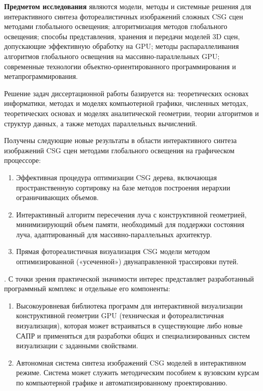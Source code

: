 \textbf{Предметом исследования} являются модели, методы и системные решения для  интерактивного синтеза фотореалистичных изображений сложных CSG сцен методами глобального освещения; алгоритмизация методов глобального освещения; способы представления, хранения и передачи моделей 3D сцен, допускающие эффективную  обработку на GPU; методы распараллеливания алгоритмов глобального освещения на массивно-параллельных GPU; современные технологии объектно-ориентированного программирования и метапрограммирования.

{\methods} Решение задач диссертационной работы базируется на: теоретических основах информатики, методах и моделях компьютерной графики, численных методах, теоретических основах и моделях аналитической геометрии, теории алгоритмов и структур данных, а также методах параллельных вычислений.

{\novelty} Получены следующие новые результаты в области интерактивного синтеза изображений CSG сцен методами глобального освещения на графическом процессоре:


\begin{enumerate}
  \item Эффективная процедура оптимизации CSG дерева, включающая пространственную сортировку на базе методов построения иерархии ограничивающих объемов.
  \item Интерактивный алгоритм пересечения луча с конструктивной геометрией, минимизирующий объем памяти, необходимый для поддержки состояния луча, адаптированный для массивно-параллельных архитектур.
  \item Прямая фотореалистичная визуализация CSG модели методом оптимизированной («усеченной») двунаправленной трассировки путей.
\end{enumerate}

{\influence}. С точки зрения практической значимости интерес представляет разработанный программный комплекс и отдельные его компоненты:

\begin{enumerate}
  \item Высокоуровневая библиотека программ для интерактивной визуализации конструктивной геометрии GPU (техническая и фотореалистичная визуализация), которая может встраиваться в существующие либо новые САПР и применяться для разработки общих и специализированных систем визуализации с заданными свойствами.
  \item Автономная система синтеза изображений CSG моделей в интерактивном режиме. Система может служить методическим пособием к вузовским курсам по компьютерной графике и автоматизированному проектированию.
\end{enumerate}

